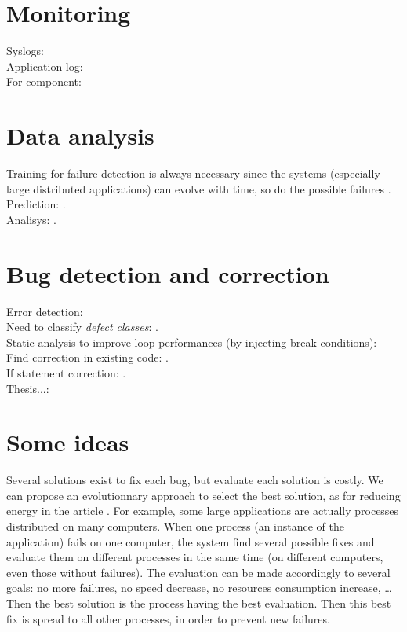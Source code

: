 \section{Monitoring}

Syslogs: \cite{Art2}\\
Application log: \cite{Art15}\\
For component: \cite{Art20}

\section{Data analysis}

Training for failure detection is always necessary since the systems (especially large distributed applications) can evolve with time, so do the possible failures \cite{Art1}.\\
Prediction: \cite{Art11}.\\
Analisys: \cite{Art12, Art14}.

\section{Bug detection and correction}

Error detection: \cite{Art17}\\
Need to classify \emph{defect classes}: \cite{Art8}.\\
Static analysis to improve loop performances (by injecting break conditions): \cite{Art9}\\
Find correction in existing code: \cite{Art6}.\\
If statement correction: \cite{Art13}.\\
Thesis...: \cite{Art18}

\section{Some ideas}

Several solutions exist to fix each bug, but evaluate each solution is costly. We can propose an evolutionnary approach to select the best solution, as for reducing energy in the article \cite{Art19}. For example, some large applications are actually processes distributed on many computers. When one process (an instance of the application) fails on one computer, the system find several possible fixes and evaluate them on different processes in the same time (on different computers, even those without failures). The evaluation can be made accordingly to several goals: no more failures, no speed decrease, no resources consumption increase, \ldots Then the best solution is the process having the best evaluation. Then this best fix is spread to all other processes, in order to prevent new failures.

